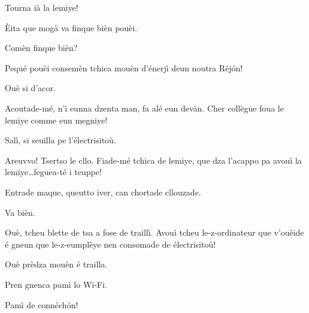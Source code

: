 \begin{drama}



\vspace*{-3pt}
\vspace*{-3pt}

\Tuenospeaks Tourna ià la lemiye!

\Richardspeaks \`Eita que mogà va finque bièn pouèi.

\Tuenospeaks Comèn finque bièn?

\Richardspeaks Pequé pouèi consemèn tchica mouèn d'énerjì deun noutra Réj\'on!

\Gerominespeaks Ouè si d'acor.

\Richardspeaks Acoutade-mé, n'i eunna dzenta man, fa alé eun devàn. Cher collègue \og foua le lemiye comme eun megniye\fg ! 


\Elettricistaspeaks{} Salì, si seuilla pe l'électrisitoù.

\Sandrinospeaks Areuvvo! Tsertso le cllo. Fiade-mé tchica de lemiye, que dza l'acappo pa avouì la lemiye\ldots feguea-té i teuppe!


\Sandrinospeaks Entrade maque, queutto iver, can chortade cllou\-za\-de.

\Elettricistaspeaks Va bièn.


\Elettricistaspeaks{} Ouè, tcheu blette de tsa a fose de traillì. Avouì tcheu le-z-ordinateur que v'ouèide é gneun que le-z-eumplèye nen consomade de électrisitoù! 

\Saventaspeaks{} Ouè prèdza mouèn é trailla.

\Gerominespeaks Pren gnenca pamì lo Wi-Fi.

\Saventaspeaks Pamì de connéch\'on!



\end{drama}
